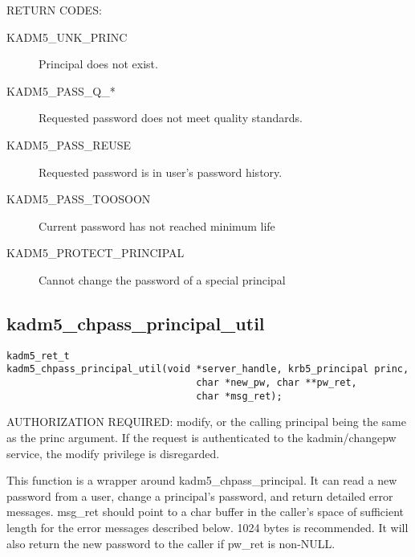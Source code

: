 RETURN CODES:

\begin{description}
\item[KADM5_UNK_PRINC] Principal does not exist.
\item[KADM5_PASS_Q_*] Requested password does not meet quality
standards. 
\item[KADM5_PASS_REUSE] Requested password is in user's
password history. 
\item[KADM5_PASS_TOOSOON] Current password has not reached minimum life
\item[KADM5_PROTECT_PRINCIPAL] Cannot change the password of a special principal
\end{description}


\subsection{kadm5_chpass_principal_util}

\begin{verbatim}
kadm5_ret_t
kadm5_chpass_principal_util(void *server_handle, krb5_principal princ,
                                 char *new_pw, char **pw_ret,
                                 char *msg_ret);
\end{verbatim}

AUTHORIZATION REQUIRED: modify, or the calling principal being the
same as the princ argument.  If the request is authenticated to the
kadmin/changepw service, the modify privilege is disregarded.

This function is a wrapper around kadm5_chpass_principal. It can
read a new password from a user, change a principal's password, and
return detailed error messages.  msg_ret should point to a char buffer
in the caller's space of sufficient length for the error messages
described below. 1024 bytes is recommended.  It will also return the
new password to the caller if pw_ret is non-NULL.

